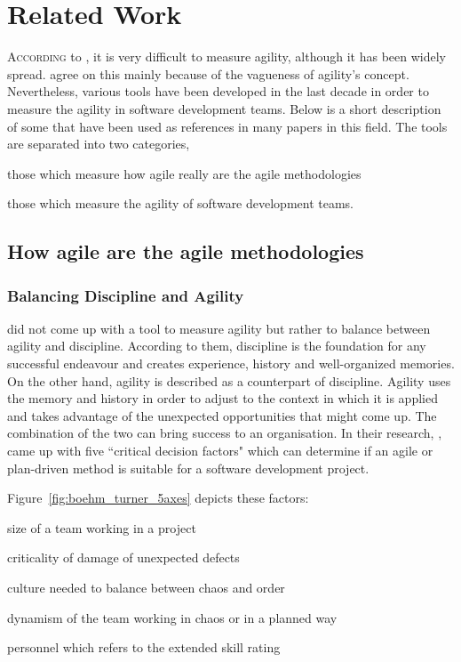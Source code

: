 \chapter{Related Work}\label{ch:related_work}

\lettrine[lines=4, loversize=-0.1, lraise=0.1]{A}{ccording} to \citet{yauch}, it is very difficult to measure agility, although it has been widely spread. \citet{tsourveloudis} agree on this mainly because of the vagueness of agility's concept. Nevertheless, various tools have been developed in the last decade in order to measure the agility in software development teams. Below is a short description of some that have been used as references in many papers in this field. The tools are separated into two categories, 
\begin{inparaenum} [a\upshape)]
\item those which measure how agile really are the agile methodologies
\item those which measure the agility of software development teams.
\end{inparaenum}

\section{How agile are the agile methodologies}

\subsection{Balancing Discipline and Agility}
\citet{1231450} did not come up with a tool to measure agility but rather to balance between agility and discipline. According to them, discipline is the foundation for any successful endeavour and creates experience, history and well-organized memories. On the other hand, agility is described as a counterpart of discipline. Agility uses the memory and history in order to adjust to the context in which it is applied and takes advantage of the unexpected opportunities that might come up. The combination of the two can bring success to an organisation. In their research, \citet{1231450}, came up with five ``critical decision factors" which can determine if an agile or plan-driven method is suitable for a software development project.

Figure~\ref{fig:boehm_turner_5axes} depicts these factors:
\begin{inparaenum} [a\upshape)]
\item size of a team working in a project
\item criticality of damage of unexpected defects
\item culture needed to balance between chaos and order
\item dynamism of the team working in chaos or in a planned way
\item personnel which refers to the extended \citet{cockburn2002agile} skill rating %
\end{inparaenum}

